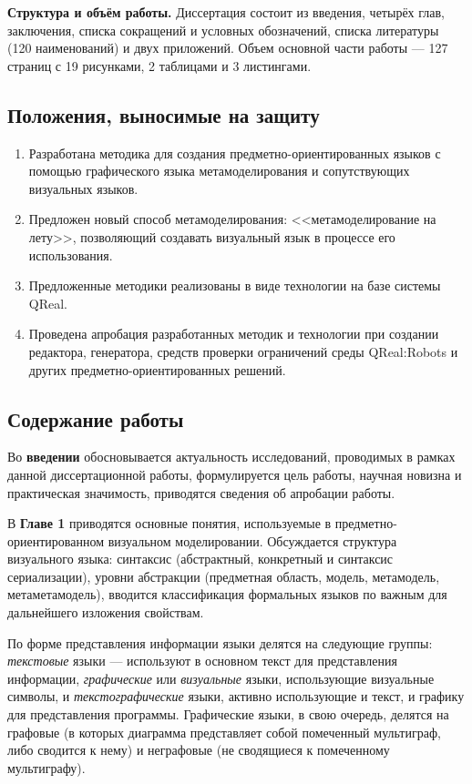 \textbf{Структура и объём работы.} Диссертация состоит из введения, четырёх глав, заключения, 
списка сокращений и условных обозначений, списка литературы (120 наименований) и двух приложений. Объем основной 
части работы --- 127 страниц с 19 рисунками, 2 таблицами и 3 листингами.

\subsection*{\Large Положения, выносимые на защиту}
\begin{enumerate}
	\item Разработана методика для создания предметно-ориентированных языков с помощью 
		графического языка метамоделирования и сопутствующих визуальных языков.
	\item Предложен новый способ метамоделирования: <<метамоделирование на лету>>, позволяющий
		создавать визуальный язык в процессе его использования.
	\item Предложенные методики реализованы в виде технологии на базе системы QReal.
	\item Проведена апробация разработанных методик и технологии при создании редактора, 
		генератора, средств проверки ограничений среды QReal:Robots и других предметно-ориентированных 
		решений.
\end{enumerate}

\subsection*{\Large Содержание работы}
Во \textbf{введении} обосновывается актуальность исследований, проводимых в рамках 
данной диссертационной работы, формулируется цель работы, научная новизна и практическая 
значимость, приводятся сведения об апробации работы.

В \textbf{Главе 1} приводятся основные понятия, используемые в 
предметно-ориентированном визуальном моделировании. Обсуждается структура 
визуального языка: синтаксис (абстрактный, конкретный и синтаксис сериализации), 
уровни абстракции (предметная область, модель, метамодель, метаметамодель), вводится 
классификация формальных языков по важным для дальнейшего изложения свойствам.

По форме представления информации языки делятся на следующие группы: \textit{текстовые} языки 
--- используют в основном текст для представления информации, \textit{графические} или 
\textit{визуальные} языки, использующие визуальные символы, и \textit{текстографические} языки,
активно использующие и текст, и графику для представления программы. Графические языки, в свою очередь, 
делятся на графовые (в которых диаграмма представляет собой помеченный мультиграф, либо сводится к нему)
и неграфовые (не сводящиеся к помеченному мультиграфу).


